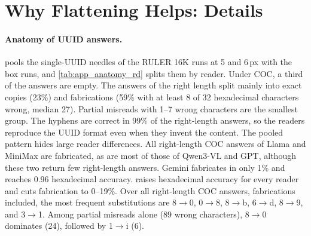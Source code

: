 \section{Why Flattening Helps: Details}
\label{app:why}

\paragraph{Anatomy of UUID answers.}
 pools the single-UUID needles of the RULER 16K runs at 5 and 6\,px with the box runs, and \cref{tab:app_anatomy_rd} splits them by reader.
Under COC, a third of the answers are empty. The answers of the right length split mainly into exact copies (23\%) and fabrications (59\% with at least 8 of 32 hexadecimal characters wrong, median 27).
Partial misreads with 1--7 wrong characters are the smallest group.
The hyphens are correct in 99\% of the right-length answers, so the readers reproduce the UUID format even when they invent the content.
The pooled pattern hides large reader differences.
All right-length COC answers of Llama and MiniMax are fabricated, as are most of those of Qwen3-VL and GPT, although these two return few right-length answers. Gemini fabricates in only 1\% and reaches 0.96 hexadecimal accuracy.
\name raises hexadecimal accuracy for every reader and cuts fabrication to 0--19\%.
Over all right-length COC answers, fabrications included, the most frequent substitutions are 8$\to$0, 0$\to$8, 8$\to$b, 6$\to$d, 8$\to$9, and 3$\to$1. Among partial misreads alone (89 wrong characters), 8$\to$0 dominates (24), followed by 1$\to$i (6).




